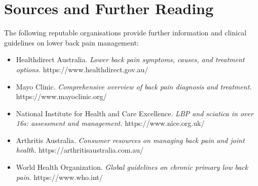 \section*{Sources and Further Reading}
The following reputable organisations provide further information and clinical guidelines on lower back pain management:
\begin{itemize}
    \item Healthdirect Australia. \textit{Lower back pain symptoms, causes, and treatment options.} https://www.healthdirect.gov.au/
    \item Mayo Clinic. \textit{Comprehensive overview of back pain diagnosis and treatment.} https://www.mayoclinic.org/
    \item National Institute for Health and Care Excellence. \textit{LBP and sciatica in over 16s: assessment and management.} https://www.nice.org.uk/
    \item Arthritis Australia. \textit{Consumer resources on managing back pain and joint health.} https://arthritisaustralia.com.au/
    \item World Health Organization. \textit{Global guidelines on chronic primary low back pain.} https://www.who.int/
\end{itemize}
